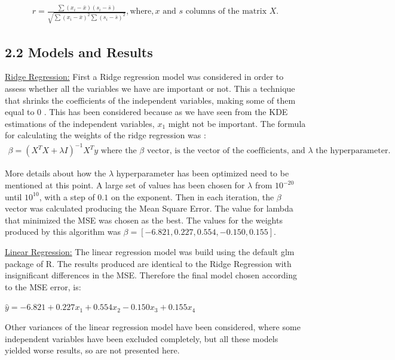 \documentclass[fleqn, a4paper]{report}
\begin{document}
\begin{align*}
r = \frac{\sum(x_i - \bar{x})(s_i - \bar{s})}{\sqrt{\sum(x_i - \bar{x})^2\sum(s_i - \bar{s})^2}}, \text{where}, x \text{~and~} s \text{~columns of the matrix~} X.
\end{align*}


\subsection*{2.2 Models and Results}

\begin{flushleft}
\underline{\large Ridge Regression:} First a Ridge regression model was considered in order to assess whether all the variables we have are important or not. This a technique that shrinks the coefficients of the independent variables, making some of them equal to $0$ \cite{varian2014big}. This has been considered because as we have seen from the KDE estimations of the independent variables, $x_1$ might not be important. The formula for calculating the weights of the ridge regression was \cite{murray_machine_2020}:
\begin{align*}
\beta = (X^TX + \lambda I)^{-1}X^Ty \text{~where the~} \beta \text{~vector, is the vector of the coefficients, and~} \lambda \text{~the hyperparameter.~}
\end{align*}

More details about how the $\lambda$ hyperparameter has been optimized need to be mentioned at this point. A large set of values has been chosen for $\lambda$ from $10^{-20}$ until $10^{10}$, with a step of $0.1$ on the exponent. Then in each iteration, the $\beta$ vector was calculated producing the Mean Square Error. The value for lambda that minimized the MSE was chosen as the best. The values for the weights produced by this algorithm was $\beta = [-6.821,  0.227,  0.554, -0.150,  0.155]$.

\underline{\large Linear Regression:} The linear regression model was build using the default \textsf{glm} package of \textsf{R}. The results produced are identical to the Ridge Regression with insignificant differences in the MSE. Therefore the final model chosen according to the MSE error, is:

$\hat{y} = -6.821 + 0.227 x_1 + 0.554 x_2 -0.150 x_3 + 0.155 x_4$
\end{flushleft}

Other variances of the linear regression model have been considered, where some independent variables have been excluded completely, but all these models yielded worse results, so are not presented here. 
\end{document}
